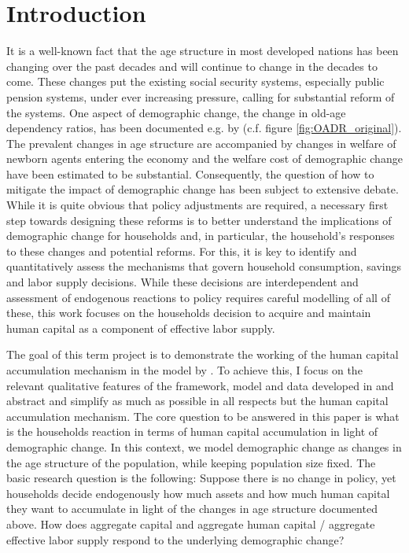 \section{Introduction} %
\label{sec:introduction}

It is a well-known fact that the age structure in most developed nations has been changing over the past decades and will continue to change in the decades to come. These changes put the existing social security systems, especially public pension systems, under ever increasing pressure, calling for substantial reform of the systems. One aspect of demographic change, the change in old-age dependency ratios, has been documented e.g. by \cite{LudwigSchelkleVogel2012} (c.f. figure \ref{fig:OADR_original}). The prevalent changes in age structure are accompanied by changes in welfare of newborn agents entering the economy and the welfare cost of demographic change have been estimated to be substantial. Consequently, the question of how to mitigate the impact of demographic change has been subject to extensive debate. While it is quite obvious that policy adjustments are required, a necessary first step towards designing these reforms is to better understand the implications of demographic change for households and, in particular, the household's responses to these changes and potential reforms. For this, it is key to identify and quantitatively assess the mechanisms that govern household consumption, savings and labor supply decisions. While these decisions are interdependent and assessment of endogenous reactions to policy requires careful modelling of all of these, this work focuses on the households decision to acquire and maintain human capital as a component of effective labor supply.


The goal of this term project is to demonstrate the working of the human capital accumulation mechanism in the model by \cite{LudwigSchelkleVogel2012}. To achieve this, I focus on the relevant qualitative features of the framework, model and data developed in \cite{LudwigSchelkleVogel2012} and abstract and simplify as much as possible in all respects but the human capital accumulation mechanism. The core question to be answered in this paper is what is the households reaction in terms of human capital accumulation in light of demographic change. In this context, we model demographic change as changes in the age structure of the population, while keeping population size fixed. The basic research question is the following: Suppose there is no change in policy, yet households decide endogenously how much assets and how much human capital they want to accumulate in light of the changes in age structure documented above. How does aggregate capital and aggregate human capital / aggregate effective labor supply respond to the underlying demographic change?

